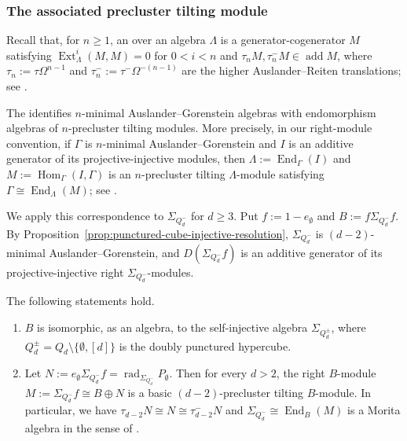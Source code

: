 \documentclass[a4paper,leqno]{amsart}
\begin{document}
\subsubsection{The associated precluster tilting module}\label{subsubsec:precluster}

Recall that, for $n\geq1$, an  over an algebra $\Lambda$ is a generator-cogenerator $M$ satisfying
$\operatorname{Ext}_{\Lambda}^i(M,M)=0$ for $0<i<n$ and
$\tau_nM,\tau_n^{-}M\in\operatorname{add}M$, where
$\tau_n:=\tau\Omega^{n-1}$ and
$\tau_n^{-}:=\tau^{-}\Omega^{-(n-1)}$ are the higher
Auslander--Reiten translations; see \cite[Definition~3.2]{IS18}.

The  identifies
$n$-minimal Auslander--Gorenstein algebras with endomorphism
algebras of $n$-precluster tilting modules. More precisely, in our
right-module convention, if $\Gamma$ is $n$-minimal
Auslander--Gorenstein and $I$ is an additive generator of its
projective-injective modules, then
$\Lambda:=\operatorname{End}_{\Gamma}(I)$ and
$M:=\operatorname{Hom}_{\Gamma}(I,\Gamma)$ is an $n$-precluster
tilting $\Lambda$-module satisfying
$\Gamma\cong\operatorname{End}_{\Lambda}(M)$; see
\cite[Proposition~4.4 and Theorem~4.5]{IS18}.

We apply this correspondence to $\Sigma_{Q_d^{-}}$ for $d\geq3$. Put
$f:=1-e_{\emptyset}$ and $B:=f\Sigma_{Q_d^{-}}f$. 
By Proposition~\ref{prop:punctured-cube-injective-resolution}, $\Sigma_{Q_d^{-}}$ is
$(d-2)$-minimal Auslander--Gorenstein, and $D(\Sigma_{Q_d^-}f)$ is an additive
generator of its projective-injective right $\Sigma_{Q_d^{-}}$-modules.

\begin{prop}\label{prop:punctured-cube-precluster}
The following statements hold.
\begin{enumerate}
    \item $B$ is isomorphic, as an algebra, to the self-injective algebra $\Sigma_{Q_d^{
\pm}}$, where $Q_d^{\pm}=Q_d\setminus\{\emptyset,[d]\}$ is the    doubly punctured hypercube. 

    \item Let $N:=e_{\emptyset}\Sigma_{Q_d^{-}}f=\operatorname{rad}_{\Sigma_{Q_d^{-}}} P_{\emptyset}$.
    Then for every $d>2$, the right $B$-module $M:=\Sigma_{Q_d^{-}}f\cong B\oplus N$ is a basic $(d-2)$-precluster
    tilting $B$-module.  In particular, we have $\tau_{d-2}N\cong N\cong\tau_{d-2}^{-}N$ and $\Sigma_{Q_d^{-}}\cong\operatorname{End}_B(M)$ is a Morita algebra in the sense of \cite{KY13}.  
\end{enumerate}
\end{prop}
\end{document}
